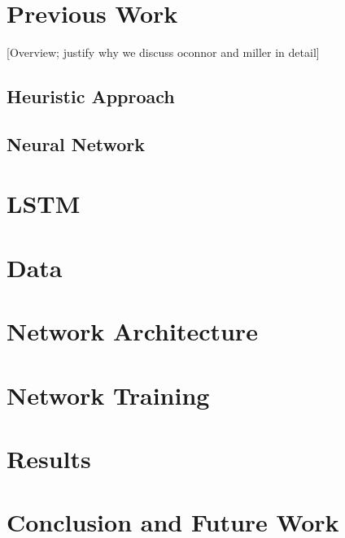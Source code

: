 \documentclass{acm_proc_article-sp}
\begin{document}
\section{Previous Work}
\label{sec:Previous Work}

[Overview; justify why we discuss oconnor and miller in detail]

\subsection{Heuristic Approach}
\label{sub:Heuristic Approach}

\subsection{Neural Network}
\label{sub:Neural Network}


\section{LSTM}
\label{sec:LSTM}

\section{Data}
\label{sec:Data}

\section{Network Architecture}
\label{sec:Network Architecture}

\section{Network Training}
\label{sec:Network Training}

\section{Results}
\label{sec:Results}

\section{Conclusion and Future Work}
\label{sec:Conclusion and Future Work}
\end{document}
